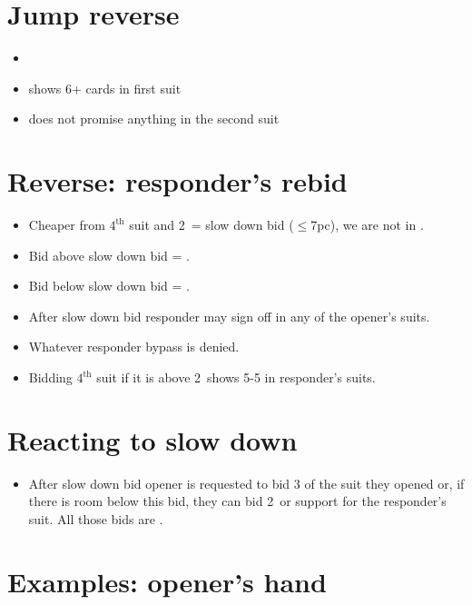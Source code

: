 \documentclass[12pt, a4paper]{article}
\begin{document}
\section{Jump reverse}
\begin{itemize}
    \item \gf
    \item shows 6+ cards in first suit
    \item does not promise anything in the second suit
\end{itemize}


\section{Reverse: responder's rebid}
\begin{itemize}
    \item Cheaper from $4^{\text{th}}$ suit and 2\nt\ = slow down bid ($\leq 7$pc), we are not in \gf.
    \item Bid above slow down bid = \gf.
    \item Bid below slow down bid = \fonce.
    \item After slow down bid responder may sign off in any of the opener's suits.
    \item Whatever responder bypass is denied. \vimp
    \item Bidding $4^{\text{th}}$ suit if it is above 2\nt\ shows 5-5 in responder's suits.
\end{itemize}

\section{Reacting to slow down}
\begin{itemize}
    \item After slow down bid opener is requested to bid 3 of the suit they opened or, if there is room
    below this bid, they can bid 2\nt\ or support for the responder's suit. All those bids are \nf.
\end{itemize}

\section{Examples: opener's hand}
\end{document}
